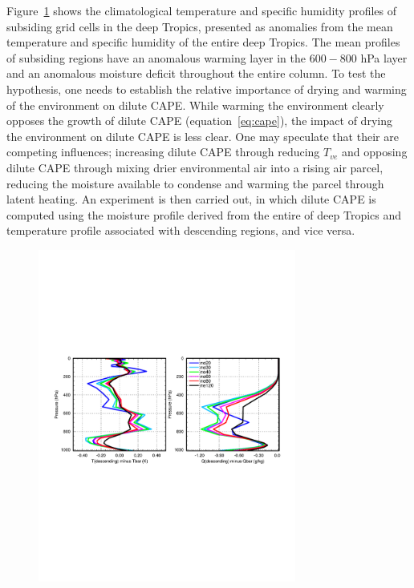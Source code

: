 \documentclass[times]{qjrms4}
\begin{document}
Figure~\ref{fig:profiles} shows the climatological temperature and specific humidity profiles of subsiding grid cells in the deep Tropics, presented as anomalies from the mean temperature and specific humidity of the entire deep Tropics. The mean profiles of subsiding regions have an anomalous warming layer in the $600-800$ hPa layer and an anomalous moisture deficit throughout the entire column. To test the hypothesis, one needs to establish the relative importance of drying and warming of the environment on dilute CAPE. While warming the environment clearly opposes the growth of dilute CAPE (equation~\ref{eq:cape}), the impact of drying the environment on dilute CAPE is less clear. One may speculate that their are competing influences; increasing dilute CAPE through reducing $T_{ve}$ and opposing dilute CAPE through mixing drier environmental air into a rising air parcel, reducing the moisture available to condense and warming the parcel through latent heating. An experiment is then carried out, in which dilute CAPE is computed using the moisture profile derived from the entire of deep Tropics and temperature profile associated with descending regions, and vice versa.

\begin{figure}
\begin{center}
\noindent\includegraphics[width=20pc,angle=0]{figs/temp_profiles.pdf}\\
\end{center}
\caption{}
\label{fig:profiles}
\end{figure}
\end{document}
